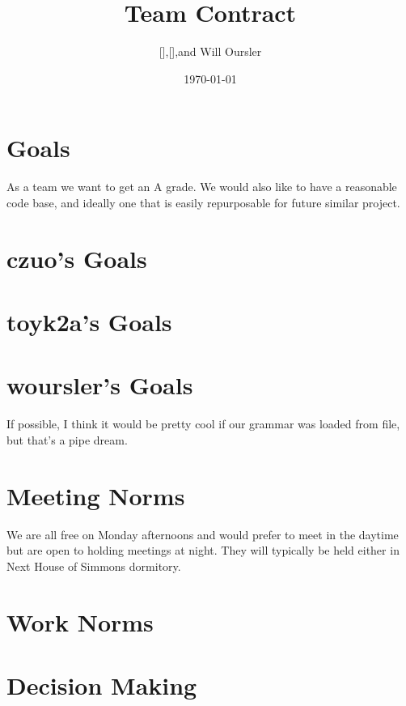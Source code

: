 


\author{ [],[],and Will Oursler} %
\address{ MIT, Cambridge, MA }
\title{Team Contract}
\date{\today}
\maketitle

\section{ Goals }
As a team we want to get an A grade. We would also like to have a reasonable code base, and ideally one that is easily repurposable for future similar project.

\section{ czuo's Goals }
\section{ toyk2a's Goals }
\section{ woursler's Goals }
If possible, I think it would be pretty cool if our grammar was loaded from file, but that's a pipe dream.

\section{Meeting Norms}
We are all free on Monday afternoons and would prefer to meet in the daytime but are open to holding meetings at night.  They will typically be held either in Next House of Simmons dormitory.  

\section{Work Norms}

\section{Decision Making}

